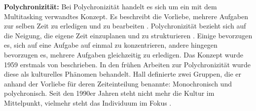 \par
\textbf{Polychronizität:}
Bei Polychronizität handelt es sich um ein mit dem Multitasking verwandtes Konzept. Es beschreibt die Vorliebe, mehrere Aufgaben zur selben Zeit zu erledigen und zu bearbeiten \cite{Baethge2010}. Polychronizität bezieht sich auf die Neigung, die eigene Zeit einzuplanen und zu strukturieren \cite{Hecht2005}. Einige bevorzugen es, sich auf eine Aufgabe auf einmal zu konzentrieren, andere hingegen bevorzugen es, mehrere Aufgaben gleichzeitig zu erledigen. Das Konzept wurde 1959 erstmals von \cite{Hall1980} beschrieben. In den frühen Arbeiten zur Polychronizität wurde diese als kulturelles Phänomen behandelt. Hall definierte zwei Gruppen, die er anhand der Vorliebe für deren Zeiteinteilung benannte: Monochronisch und polychronisch. Seit den 1990er Jahren steht nicht mehr die Kultur im Mittelpunkt, vielmehr steht das Individuum im Fokus \cite{Baethge2010}.

